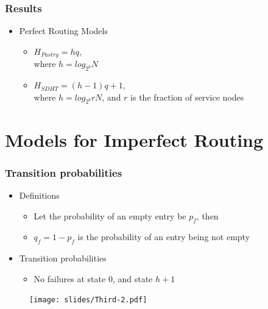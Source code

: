 \documentclass[xcolor=pdftex,dvipsnames,table]{beamer}
\begin{document}
\begin{frame}
\frametitle{Results}
   \begin{itemize}
    \item Perfect Routing Models  \vspace{+0.2in}
      \begin{itemize}
        \item {\Large \textbf{$H_{Pastry} = hq$}}, \\ \vspace{+0.1in} where $h = log_{2^b}
        N$ \vspace{+0.3in}
        \item {\Large \textbf{$H_{SDHT} =  (h-1)q+1$}}, \\ \vspace{+0.1in} where
        $h = log_{2^b}rN$, and $r$ is the fraction of service nodes
      \end{itemize}
  \end{itemize}
\end{frame}


\section{Models for Imperfect Routing}
\begin{frame}
\frametitle{Transition probabilities}
\begin{block}{}
  \begin{itemize}
    \item Definitions
    \begin{itemize}
      \item Let the probability of   an empty entry  be  $p_f$, then
      \item $q_f = 1-p_f$ is the probability of an entry  being not empty
   \end{itemize} \vspace{+0.15in}
   \item Transition probabilities
   \begin{itemize}
     \item No failures at state $0$, and state $h+1$
   \end{itemize}
  \end{itemize}
  \end{block}
\begin{block}{}
  \begin{center}
    \begin{figure}%
        \texttt{[image: slides/Third-2.pdf]}
    \end{figure}
  \end{center}
\end{block}
\end{frame}
\end{document}
